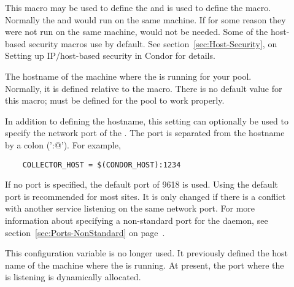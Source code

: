\begin{description}
  
\item[] \label{param:CondorHost} This macro may be
  used to define the  and is used to define the
   macro.  Normally the 
  and  would run on the same machine.  If for some
  reason they were not run on the same machine,
   would not be needed.  Some
  of the host-based security macros use  by
  default.  See section~\ref{sec:Host-Security}, on Setting up
  IP/host-based security in Condor for details.
  
\item[] \label{param:CollectorHost} The
  hostname of the machine where the  is running for
  your pool.  Normally, it is defined relative to
  the 
  macro.  There is no default value for this macro;
   must be defined for the pool to work
  properly.

  In addition to defining the hostname, this setting can optionally be
  used to specify the network port of the .
  The port is separated from the hostname by a colon ('\verb@:@').
  For example,
  \begin{verbatim}
    COLLECTOR_HOST = $(CONDOR_HOST):1234
  \end{verbatim}
  If no port is specified, the default port of 9618 is used.
  Using the default port is recommended for most sites.
  It is only changed if there is a conflict with another
  service listening on the same network port.
  For more information about specifying a non-standard port for the
   daemon,
  see section~\ref{sec:Ports-NonStandard} on
  page~\pageref{sec:Ports-NonStandard}.


\item[] \label{param:NegotiatorHost} 
  This configuration variable is no longer used.
  It previously defined the host name of the machine where 
  the  is running.
  At present, the port where the  is listening 
  is dynamically allocated.



\end{description}
